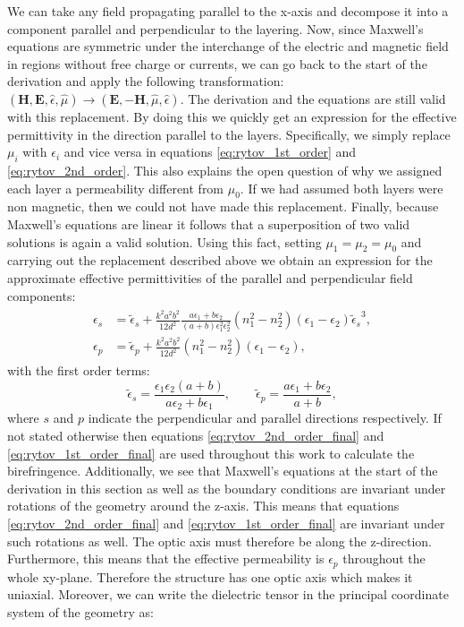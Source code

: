 We can take any field propagating parallel to the x-axis and decompose it into a component parallel and perpendicular to the layering. Now, since Maxwell's equations are symmetric under the interchange of the electric and magnetic field in regions without free charge or currents, we can go back to the start of the derivation and apply the following transformation: $(\bm{H},\bm{E},\hat{\epsilon},\hat{\mu}) \rightarrow (\bm{E},\bm{-H},\hat{\mu},\hat{\epsilon})$. The derivation and the equations are still valid with this replacement. By doing this we quickly get an expression for the effective permittivity in the direction parallel to the layers. Specifically, we simply replace $\mu_i$ with $\epsilon_i$ and vice versa in equations \ref{eq:rytov_1st_order} and \ref{eq:rytov_2nd_order}. This also explains the open question of why we assigned each layer a permeability different from $\mu_0$. If we had assumed both layers were non magnetic, then we could not have made this replacement. Finally, because Maxwell's equations are linear it follows that a superposition of two valid solutions is again a valid solution. Using this fact, setting $\mu_1=\mu_2=\mu_0$ and carrying out the replacement described above we obtain an expression for the approximate effective permittivities of the parallel and perpendicular field components:
\begin{align}
\begin{split}
    \label{eq:rytov_2nd_order_final}
    \epsilon_{s} &= \tilde{\epsilon}_{s} + \frac{k^2a^2b^2}{12d^2} \frac{a\epsilon_1+b\epsilon_2}{(a+b)\epsilon_1^2\epsilon_2^2}\left(n_1^2-n_2^2\right)\left(\epsilon_1-\epsilon_2\right){\tilde{\epsilon}_{s}}^3,
    \\
    \epsilon_{p} &= \tilde{\epsilon}_{p} + \frac{k^2a^2b^2}{12d^2}\left(n_1^2-n_2^2\right)\left(\epsilon_1-\epsilon_2\right), 
\end{split}
\end{align}
with the first order terms:
\begin{equation}
    \label{eq:rytov_1st_order_final}
    \tilde{\epsilon}_{s} = \frac{\epsilon_1 \epsilon_2 (a+b)}{a\epsilon_2+b\epsilon_1},
    \qquad
    \tilde{\epsilon}_{p} = \frac{a\epsilon_1+b\epsilon_2}{a+b},
\end{equation}
where $s$ and $p$ indicate the perpendicular and parallel directions respectively. If not stated otherwise then equations \ref{eq:rytov_2nd_order_final} and \ref{eq:rytov_1st_order_final} are used throughout this work to calculate the birefringence. Additionally, we see that Maxwell's equations at the start of the derivation in this section as well as the boundary conditions are invariant under rotations of the geometry around the z-axis. This means that equations \ref{eq:rytov_2nd_order_final} and \ref{eq:rytov_1st_order_final} are invariant under such rotations as well. The optic axis must therefore be along the z-direction. Furthermore, this means that the effective permeability is $\epsilon_{p}$ throughout the whole xy-plane. Therefore the structure has one optic axis which makes it uniaxial. Moreover, we can write the dielectric tensor in the principal coordinate system of the geometry as:
